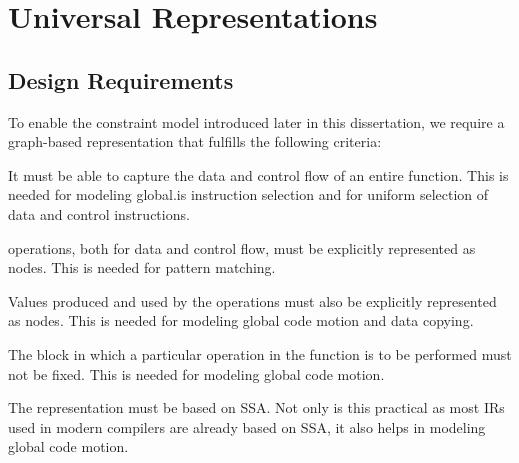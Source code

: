 %

\chapter{Universal Representations}




\section{Design Requirements}

To enable the \gls{constraint model} introduced later in this dissertation, we
require a \gls{graph}-based representation that fulfills the following criteria:
%
\begin{requirements}
  \item {}
    It must be able to capture the data and control flow of an entire
    \gls{function}.
    This is needed for modeling \gls{global.is} \gls{instruction selection}
    and for uniform selection of data and control \glspl{instruction}.
  \item {}
    \Glspl{operation}, both for data and control flow, must be explicitly
    represented as \glspl{node}.
    This is needed for \gls{pattern matching}.
  \item {}
    Values produced and used by the \glspl{operation} must also be explicitly
    represented as \glspl{node}.
    This is needed for modeling \gls{global code motion} and \gls{data copying}.
  \item {}
    The \gls{block} in which a particular \gls{operation} in the \gls{function}
    is to be performed must not be fixed.
    This is needed for modeling \gls{global code motion}.
  \item {}
    The representation must be based on \gls{SSA}.
    Not only is this practical as most \glspl{IR} used in modern
    \glspl{compiler} are already based on \gls{SSA}, it also helps in modeling
    \gls{global code motion}.
\end{requirements}

